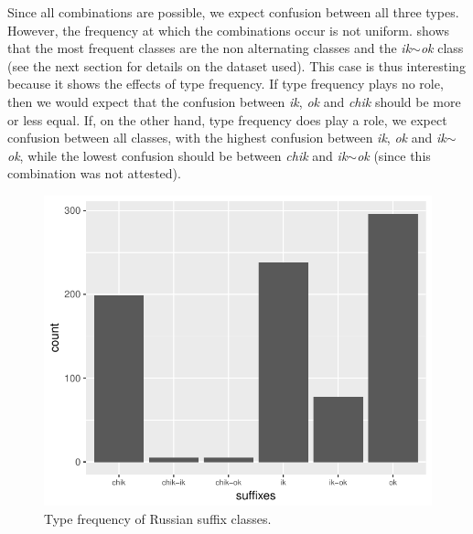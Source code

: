 Since all combinations are possible, we expect confusion between all three types. However, the frequency at which the combinations occur is not uniform.  shows that the most frequent classes are the non alternating classes and the \textit{ik$\sim$ok} class (see the next section for details on the dataset used). This case is thus interesting because it shows the effects of type frequency. If type frequency plays no role, then we would expect that the confusion between \textit{ik}, \textit{ok} and \textit{chik} should be more or less equal. If, on the other hand, type frequency does play a role, we expect confusion between all classes, with the highest confusion between \textit{ik}, \textit{ok} and \textit{ik$\sim$ok}, while the lowest confusion should be between \textit{chik} and \textit{ik$\sim$ok} (since this combination was not attested).

\begin{figure}
  \centering
  \includegraphics[scale=0.7]{./figures/russian/suffixes}
  \caption{Type frequency of Russian suffix classes.}\label{fig:freqs-russ-dims}
\end{figure}

